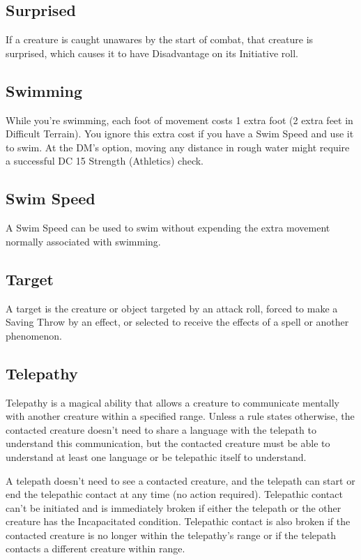 \documentclass[10pt,a4paper,twoside,bg=print,twocolumn,openany,nodeprecatedcode]{dndarticle}
\begin{document}
\subsection{Surprised}
If a creature is caught unawares by the start of combat, that creature is surprised, which causes it to have Disadvantage on its Initiative roll.

\subsection{Swimming}
While you're swimming, each foot of movement costs 1 extra foot (2 extra feet in Difficult Terrain). You ignore this extra cost if you have a Swim Speed and use it to swim. At the DM's option, moving any distance in rough water might require a successful DC 15 Strength (Athletics) check.

\subsection{Swim Speed}
A Swim Speed can be used to swim without expending the extra movement normally associated with swimming.

\subsection{Target}
A target is the creature or object targeted by an attack roll, forced to make a Saving Throw by an effect, or selected to receive the effects of a spell or another phenomenon.

\subsection{Telepathy}
Telepathy is a magical ability that allows a creature to communicate mentally with another creature within a specified range. Unless a rule states otherwise, the contacted creature doesn't need to share a language with the telepath to understand this communication, but the contacted creature must be able to understand at least one language or be telepathic itself to understand.

A telepath doesn't need to see a contacted creature, and the telepath can start or end the telepathic contact at any time (no action required). Telepathic contact can't be initiated and is immediately broken if either the telepath or the other creature has the Incapacitated condition. Telepathic contact is also broken if the contacted creature is no longer within the telepathy's range or if the telepath contacts a different creature within range.
\end{document}
